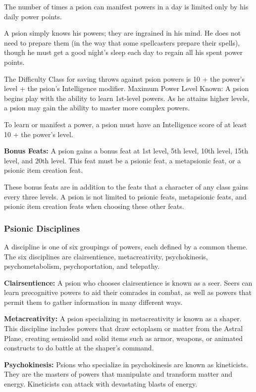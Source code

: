 The number of times a psion can manifest powers in a day is limited only by his daily power points.

A psion simply knows his powers; they are ingrained in his mind. He does not need to prepare them (in the way that some spellcasters prepare their spells), though he must get a good night's sleep each day to regain all his spent power points.

The Difficulty Class for saving throws against psion powers is 10 + the power's level + the psion's Intelligence modifier. Maximum Power Level Known: A psion begins play with the ability to learn 1st-level powers. As he attains higher levels, a psion may gain the ability to master more complex powers.

To learn or manifest a power, a psion must have an Intelligence score of at least 10 + the power's level.

\textbf{Bonus Feats:} A psion gains a bonus feat at 1st level, 5th level, 10th level, 15th level, and 20th level. This feat must be a psionic feat, a metapsionic feat, or a psionic item creation feat.

These bonus feats are in addition to the feats that a character of any class gains every three levels. A psion is not limited to psionic feats, metapsionic feats, and psionic item creation feats when choosing these other feats.

\subsubsection{Psionic Disciplines}

A discipline is one of six groupings of powers, each defined by a common theme. The six disciplines are clairsentience, metacreativity, psychokinesis, psychometabolism, psychoportation, and telepathy.

\textbf{Clairsentience:} A psion who chooses clairsentience is known as a seer. Seers can learn precognitive powers to aid their comrades in combat, as well as powers that permit them to gather information in many different ways.

\textbf{Metacreativity:} A psion specializing in metacreativity is known as a shaper. This discipline includes powers that draw ectoplasm or matter from the Astral Plane, creating semisolid and solid items such as armor, weapons, or animated constructs to do battle at the shaper's command.

\textbf{Psychokinesis:} Psions who specialize in psychokinesis are known as kineticists. They are the masters of powers that manipulate and transform matter and energy. Kineticists can attack with devastating blasts of energy.

